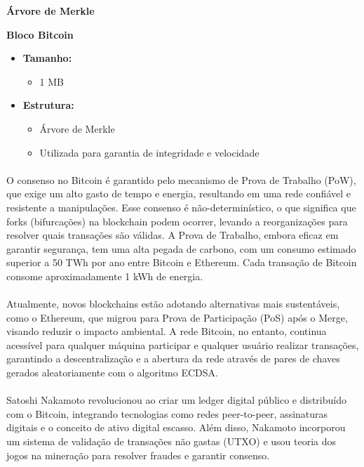 \documentclass[letterpaper,11pt,leqno]{article}
\begin{document}
\textbf{Árvore de Merkle}

\textbf{Bloco Bitcoin}
\begin{itemize}
	\item \textbf{Tamanho:}
	      \begin{itemize}
		      \item 1 MB
	      \end{itemize}
	\item \textbf{Estrutura:}
	      \begin{itemize}
		      \item Árvore de Merkle
		      \item Utilizada para garantia de integridade e velocidade
	      \end{itemize}
\end{itemize}

\paragraph{}
O consenso no Bitcoin é garantido pelo mecanismo de Prova de Trabalho (PoW), que
exige um alto gasto de tempo e energia, resultando em uma rede confiável e
resistente a manipulações. Esse consenso é não-determinístico, o que significa
que forks (bifurcações) na blockchain podem ocorrer, levando a reorganizações
para resolver quais transações são válidas. A Prova de Trabalho, embora eficaz
em garantir segurança, tem uma alta pegada de carbono, com um consumo estimado
superior a 50 TWh por ano entre Bitcoin e Ethereum. Cada transação de Bitcoin
consome aproximadamente 1 kWh de energia.

\paragraph{}
Atualmente, novos blockchains estão adotando alternativas mais sustentáveis,
como o Ethereum, que migrou para Prova de Participação (PoS) após o Merge,
visando reduzir o impacto ambiental. A rede Bitcoin, no entanto, continua
acessível para qualquer máquina participar e qualquer usuário realizar
transações, garantindo a descentralização e a abertura da rede através de pares
de chaves gerados aleatoriamente com o algoritmo ECDSA.\@

\paragraph{}
Satoshi Nakamoto revolucionou ao criar um ledger digital público e distribuído
com o Bitcoin, integrando tecnologias como redes peer-to-peer, assinaturas
digitais e o conceito de ativo digital escasso. Além disso, Nakamoto incorporou
um sistema de validação de transações não gastas (UTXO) e usou teoria dos jogos
na mineração para resolver fraudes e garantir consenso.
\end{document}
